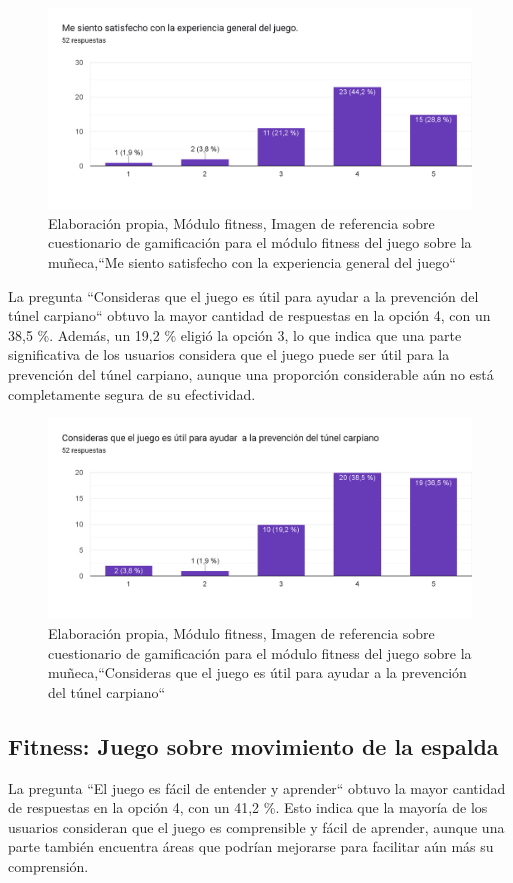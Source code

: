     \begin{figure}[H]
  \centering
  \includegraphics[width=0.7\linewidth]{Imagenes/fc10.png}
  \caption{Elaboración propia, Módulo fitness, Imagen de referencia sobre cuestionario  de gamificación para el módulo fitness del juego sobre la muñeca,``Me siento satisfecho con la experiencia general del juego``}
  \label{fig:cuestionario10fitness}
\end{figure}

La pregunta ``Consideras que el juego es útil para ayudar a la prevención del túnel carpiano`` obtuvo la mayor cantidad de respuestas en la opción 4, con un 38,5 \%. Además, un 19,2 \% eligió la opción 3, lo que indica que una parte significativa de los usuarios considera que el juego puede ser útil para la prevención del túnel carpiano, aunque una proporción considerable aún no está completamente segura de su efectividad.


    \begin{figure}[H]
  \centering
  \includegraphics[width=0.7\linewidth]{Imagenes/fc11.png}
  \caption{Elaboración propia, Módulo fitness, Imagen de referencia sobre cuestionario  de gamificación para el módulo fitness del juego sobre la muñeca,``Consideras que el juego es útil para ayudar a la prevención del túnel carpiano``  }
  \label{fig:cuestionario11fitness}
\end{figure}



\subsection{Fitness: Juego sobre movimiento de la espalda}
La pregunta ``El juego es fácil de entender y aprender`` obtuvo la mayor cantidad de respuestas en la opción 4, con un 41,2 \%. Esto indica que la mayoría de los usuarios consideran que el juego es comprensible y fácil de aprender, aunque una parte también encuentra áreas que podrían mejorarse para facilitar aún más su comprensión.

